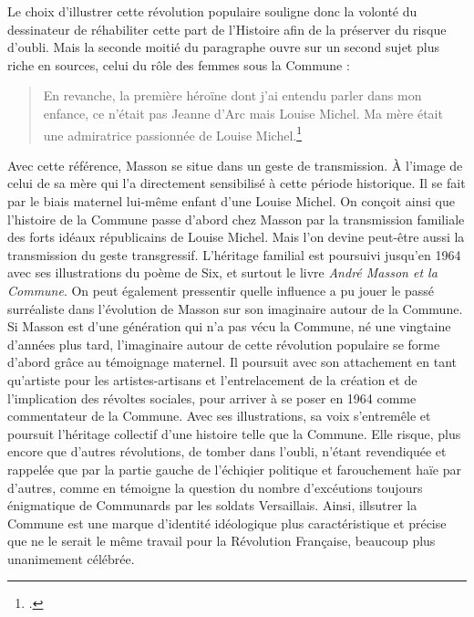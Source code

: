     Le choix d’illustrer cette révolution populaire souligne donc la volonté du dessinateur de réhabiliter cette part de l’Histoire afin de la préserver du risque d’oubli. Mais la seconde moitié du paragraphe ouvre sur un second sujet plus riche en sources, celui du rôle des femmes sous la Commune : 

\begin{quote}
En revanche, la première héroïne dont j’ai entendu parler dans mon enfance, ce n’était pas Jeanne d’Arc mais Louise Michel. Ma mère était une admiratrice passionnée de Louise Michel.\footcite{commune}	
\end{quote}	
	
	Avec cette référence, Masson se situe dans un geste de transmission.  À l’image de celui de sa mère qui l’a directement sensibilisé à cette période historique. Il se fait par le biais maternel lui-même enfant d’une Louise Michel. On conçoit ainsi que l’histoire de la Commune passe d'abord chez Masson par la transmission familiale des forts idéaux républicains de Louise Michel. Mais l'on devine peut-être aussi la transmission du geste transgressif. L'héritage familial est poursuivi jusqu'en 1964 avec ses illustrations du poème de Six, et surtout le livre \emph{André Masson et la Commune}. On peut également pressentir quelle influence a pu jouer le passé surréaliste dans l'évolution de Masson sur son imaginaire autour de la Commune.  Si Masson est d’une génération qui n’a pas vécu la Commune, né une vingtaine d’années plus tard, l’imaginaire autour de cette révolution populaire se forme d’abord grâce au témoignage maternel. Il poursuit avec son attachement en tant qu'artiste pour les artistes-artisans et l'entrelacement de la création et de l'implication des révoltes sociales, pour arriver à se poser en 1964 comme commentateur de la Commune. Avec ses illustrations, sa voix s'entremêle et poursuit l'héritage collectif d'une histoire telle que la Commune. Elle risque, plus encore que d'autres révolutions, de  tomber dans l'oubli, n'étant revendiquée et rappelée que par la partie gauche de l'échiqier politique et farouchement haïe par d'autres, comme en témoigne la question du nombre d'excéutions toujours énigmatique de Communards par les soldats Versaillais. Ainsi, illsutrer la Commune est une marque d'identité idéologique plus caractéristique et précise que ne le serait le même travail pour la Révolution Française, beaucoup plus unanimement célébrée. 


